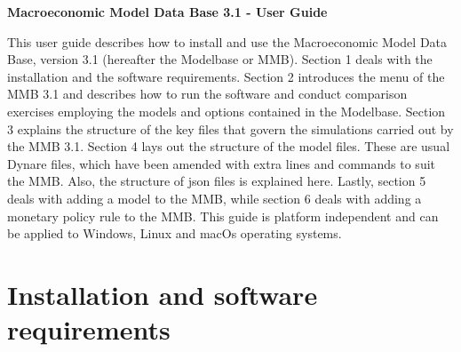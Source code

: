 \documentclass[11pt,a4paper]{article}
\begin{document}


\begin{center}
{\Large \textbf{Macroeconomic Model Data Base 3.1 - User Guide } }
\par\end{center}


\vspace{1.5cm}


\noindent This user guide describes how to install and use the Macroeconomic Model Data Base, version 3.1 (hereafter the Modelbase or MMB). Section 1 deals with the installation and the software requirements.
Section 2 introduces the menu of the MMB 3.1 and describes how to run the software and conduct comparison exercises employing the models and options contained in the Modelbase.
Section 3 explains the structure of the key files that govern the simulations carried out by the MMB 3.1. 
Section 4 lays out the structure of the model files. These are usual Dynare files, which have been amended with extra lines and commands to suit the MMB. Also, the structure of json files is explained here.
Lastly, section 5 deals with adding a model to the MMB, while section 6 deals with adding a monetary policy rule to the MMB.
This guide is platform independent and can be applied to Windows, Linux and macOs operating systems.


%
%
%
\section{Installation and software requirements}\label{sec:installation}
\vspace{0.5cm}

\end{document}
